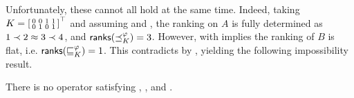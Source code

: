 Unfortunately, these cannot all hold at the same time. Indeed, taking
$
    K = \left[\begin{smallmatrix}
        0 & 0 & 1 & 1 \\
        0 & 1 & 0 & 1
    \end{smallmatrix}\right]^\top
$
and assuming \anon{} and \posresp{}, the ranking on $A$ is
fully determined as $1 \prec 2 \approx 3 \prec 4$, and $\mathsf{ranks}({\preceq_K^\varphi}) = 3$.
However, \anon{} with \dualaxiom{} implies the ranking of $B$ is
flat, i.e.  $\mathsf{ranks}({\sqsubseteq_K^\varphi}) = 1$. This contradicts \chaindef{} by
, yielding the following
impossibility result.

\begin{theorem}
    \label{tourn_result_chaindef_impossibility}

    There is no operator satisfying \chaindef{}, \anon{},
    \dualaxiom{} and \posresp{}.

\end{theorem}

